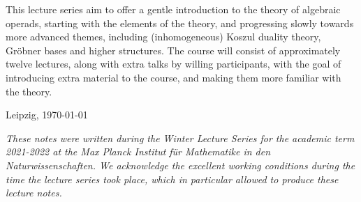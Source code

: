 \documentclass[fleqn, a4paper, twoside]{article}
\title{\vspace{-5 em}\setstretch{0.85}{\textbf{Algebraic operads, Koszul duality and Gr\"obner bases: an introduction}}}
\author{P. Tamaroff}
\date{August 22 and 24}
\newcommand{\0}{\langle 0\rangle}
\DeclareRobustCommand{\[}{\begin{equation}}%
\DeclareRobustCommand{\]}{\end{equation}}%
\theoremstyle{mytheorem}
\theoremstyle{introthm}
\theoremstyle{mydefinition}
\theoremstyle{mydefinition2}
\theoremstyle{plain} %
\newcommand{\?}{\,?\,}
\theoremstyle{mytheorem}
\theoremstyle{plain} %
\renewenvironment{abstract}{%
\small\begin{center}
\begin{minipage}{.9\textwidth}
}
{\par\noindent\end{minipage}\end{center}\vspace{3 em}}
\newcommand\blankpage{%
    \null
    \thispagestyle{empty}%
    \newpage}
\begin{document}
\maketitle


\thispagestyle{empty}

\begin{abstract}
This lecture series aim to offer a gentle introduction
to the theory of algebraic operads, starting with the
elements of the theory, and progressing slowly towards
more advanced themes, including (inhomogeneous)
Koszul duality theory, Gr\"obner bases and higher
structures. The course will consist of approximately
twelve lectures, along with extra talks by
willing participants, with the goal of introducing extra
material to the course, and making them more
familiar with the theory.
\end{abstract}


\vfill

\hfill	Leipzig, \today


\afterpage{\blankpage}

\newpage

\vspace*{\fill} 
\emph{These notes were written during the Winter Lecture
Series for the academic term 2021-2022 at the \emph{Max
Planck Institut f\"ur Mathematike in den Naturwissenschaften}.
We acknowledge the excellent working
conditions during the time the lecture series took place,
which in particular allowed to produce these lecture notes. }
\vspace*{\fill} 
 \afterpage{\blankpage}

\newpage

\thispagestyle{empty}
\end{document}
